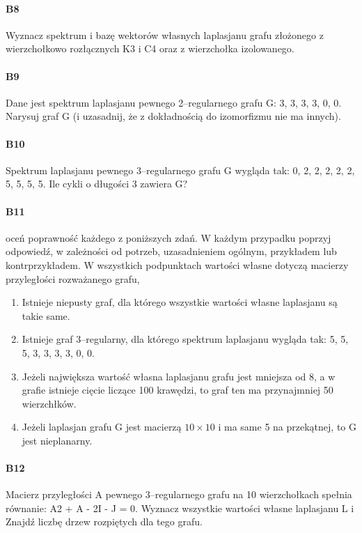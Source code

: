 \paragraph{B8} Wyznacz spektrum i bazę wektorów własnych laplasjanu grafu złożonego z wierzchołkowo rozłącznych K3 i C4 oraz z wierzchołka izolowanego.

\paragraph{B9} Dane jest spektrum laplasjanu pewnego 2–regularnego grafu G: 3, 3, 3, 3, 0, 0. Narysuj graf G (i uzasadnij, że z dokładnością do izomorfizmu nie ma innych).

\paragraph{B10} Spektrum laplasjanu pewnego 3–regularnego grafu G wygląda tak: 0, 2, 2, 2, 2, 2, 5, 5, 5, 5. Ile cykli o długości 3 zawiera G?

\paragraph{B11} oceń poprawność każdego z poniższych zdań. W każdym przypadku poprzyj odpowiedź, w zależności od potrzeb, uzasadnieniem ogólnym, przykładem lub kontrprzykładem. W wszystkich podpunktach wartości własne dotyczą macierzy przyległości rozważanego grafu,
\begin{enumerate}[label=\alph*)]
\item  Istnieje niepusty graf, dla którego wszystkie wartości własne laplasjanu są takie same.
\item  Istnieje graf 3–regularny, dla którego spektrum laplasjanu wygląda tak: 5, 5, 5, 3, 3, 3, 3, 0, 0.
\item  Jeżeli największa wartość własna laplasjanu grafu jest mniejsza od 8, a w grafie istnieje cięcie liczące 100 krawędzi, to graf ten ma przynajmniej 50 wierzchłków.
\item  Jeżeli laplasjan grafu G jest macierzą $10 \times 10$ i ma same 5 na przekątnej, to G jest nieplanarny.
\end{enumerate}

\paragraph{B12} Macierz przyległości A pewnego 3–regularnego grafu na 10 wierzchołkach spełnia równanie: A2 + A - 2I - J = 0. Wyznacz wszystkie wartości własne laplasjanu L i Znajdź liczbę drzew rozpiętych dla tego grafu.

